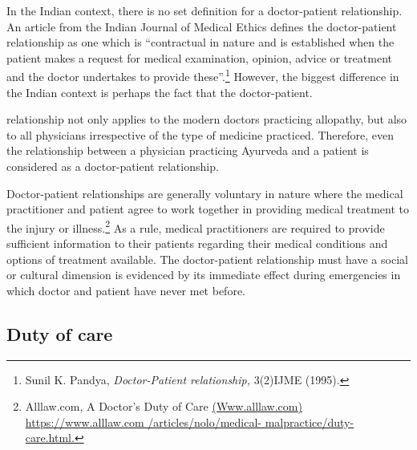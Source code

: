\begin{multicols}{2}
\vspace{1cm}

\noi
In the Indian context, there is no set definition for a doctor-patient relationship. An
article from the Indian Journal of Medical Ethics defines the doctor-patient relationship
as one which is “contractual in nature and is established when the patient makes a request for medical examination, opinion, advice or treatment and the doctor undertakes to provide these”.\footnote{ Sunil K. Pandya, \textit{Doctor-Patient relationship,} 3(2)IJME (1995).} However, the biggest difference in the Indian context is perhaps the fact that the doctor-patient.

\noi
relationship not only applies to the modern doctors practicing allopathy, but also to all
physicians irrespective of the type of medicine practiced. Therefore, even the
relationship between a physician practicing Ayurveda and a patient is considered as a
doctor-patient relationship.


\noi
Doctor-patient relationships are generally voluntary in nature where the medical
practitioner and patient agree to work together in providing medical treatment to the
injury or illness.\footnote{Alllaw.com, A Doctor's Duty of Care \url{(Www.alllaw.com) https://www.alllaw.com
/articles/nolo/medical- malpractice/duty-care.html.}} As a rule, medical practitioners are required to provide sufficient
information to their patients regarding their medical conditions and options of treatment
available. The doctor-patient relationship must have a social or cultural dimension is
evidenced by its immediate effect during emergencies in which doctor and patient have
never met before.

\vspace{-.3cm}

\subsection*{Duty of care}

\vspace{-.2cm}


\end{multicols}
